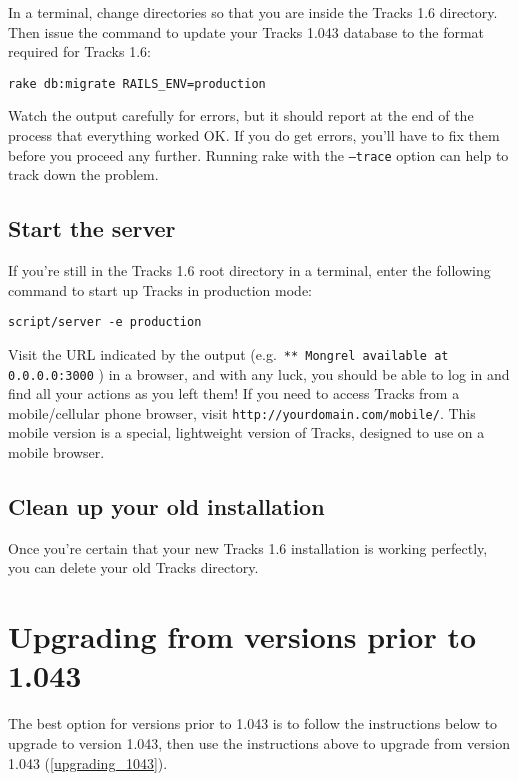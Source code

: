 \documentclass[10pt,twoside]{memoir}
\begin{document}
In a terminal, change directories so that you are inside the Tracks 1.6 directory. Then issue the command to update your Tracks 1.043 database to the format required for Tracks 1.6:


\texttt{rake db:migrate RAILS\_ENV=production}


Watch the output carefully for errors, but it should report at the end of the process that everything worked OK. If you do get errors, you'll have to fix them before you proceed any further. Running rake with the \texttt{--trace} option can help to track down the problem.


\subsection{Start the server}
\label{startserver_upgrade}

If you're still in the Tracks 1.6 root directory in a terminal, enter the following command to start up Tracks in production mode:


\texttt{script/server -e production}


Visit the URL indicated by the output (e.g.\ \texttt{** Mongrel available at 0.0.0.0:3000}
) in a browser, and with any luck, you should be able to log in and find all your actions as you left them! If you need to access Tracks from a mobile/cellular phone browser, visit \texttt{http://yourdomain.com/mobile/}. This mobile version is a special, lightweight version of Tracks, designed to use on a mobile browser.


\subsection{Clean up your old installation}
\label{cleanup_upgrade}

Once you're certain that your new Tracks 1.6 installation is working perfectly, you can delete your old Tracks directory.


\section{Upgrading from versions prior to 1.043}
\label{upgradingfromversionspriorto1.043}

The best option for versions prior to 1.043 is to follow the instructions below to upgrade to version 1.043, then use the instructions above to upgrade from version 1.043 (\autoref{upgrading_1043}).
\end{document}
